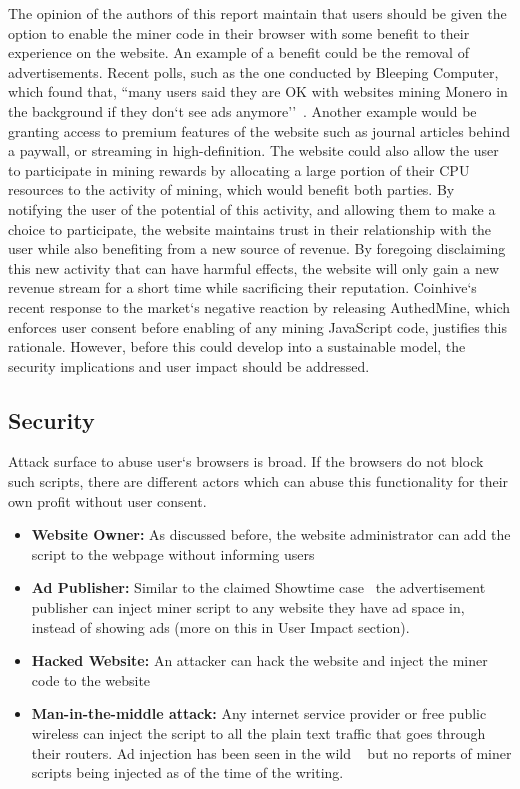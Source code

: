 The opinion of the authors of this report maintain that users should be given the option to enable the miner code in their browser with some benefit to their experience on the website.  An example of a benefit could be the removal of advertisements. Recent polls, such as the one conducted by Bleeping Computer, which found that, ``many users said they are OK with websites mining Monero in the background if they don`t see ads anymore''~\cite{bleepingcomputerminers}. Another example would be granting access to premium features of the website such as journal articles behind a paywall, or streaming in high-definition. The website could also allow the user to participate in mining rewards by allocating a large portion of their CPU resources to the activity of mining, which would benefit both parties. By notifying the user of the potential of this activity, and allowing them to make a choice to participate, the website maintains trust in their relationship with the user while also benefiting from a new source of revenue. By foregoing disclaiming this new activity that can have harmful effects, the website will only gain a new revenue stream for a short time while sacrificing their reputation. Coinhive`s recent response to the market`s negative reaction by releasing AuthedMine, which enforces user consent before enabling of any mining JavaScript code, justifies this rationale. However, before this could develop into a sustainable model, the security implications and user impact should be addressed.

\subsection{Security}
Attack surface to abuse user`s browsers is broad. If the browsers do not block such scripts, there are different actors which can abuse this functionality for their own profit without user consent.
\begin{itemize}
\item \textbf{Website Owner:} As discussed before, the website administrator can add the script to the webpage without informing users
\item \textbf{Ad Publisher:} Similar to the claimed Showtime case~\cite{showtimehive} the advertisement publisher can inject miner script to any website they have ad space in, instead of showing ads (more on this in User Impact section).
\item \textbf{Hacked Website:} An attacker can hack the website and inject the miner code to the website
\item \textbf{Man-in-the-middle attack:} Any internet service provider or free public wireless can inject the script to all the plain text traffic that goes through their routers. Ad injection has been seen in the wild ~\cite{vergeadinjection} but no reports of miner scripts being injected as of the time of the writing.
\end{itemize}

